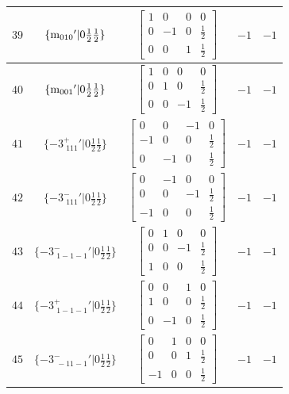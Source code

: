 \documentclass[fleqn,8pt]{jsarticle}
\begin{document}
\begin{longtable}{ccccc}
$ 39 $ & $ \{{\rm m}_{010}{}'|0 \frac{1}{2} \frac{1}{2}\} $ & $ \begin{bmatrix} 1 & 0 & 0 & 0 \\ 0 & -1 & 0 & \frac{1}{2} \\ 0 & 0 & 1 & \frac{1}{2} \end{bmatrix} $ & $ -1 $ & $ -1 $ \\ \hline
$ 40 $ & $ \{{\rm m}_{001}{}'|0 \frac{1}{2} \frac{1}{2}\} $ & $ \begin{bmatrix} 1 & 0 & 0 & 0 \\ 0 & 1 & 0 & \frac{1}{2} \\ 0 & 0 & -1 & \frac{1}{2} \end{bmatrix} $ & $ -1 $ & $ -1 $ \\ \hline
$ 41 $ & $ \{-3^{+}_{\,\,111}{}'|0 \frac{1}{2} \frac{1}{2}\} $ & $ \begin{bmatrix} 0 & 0 & -1 & 0 \\ -1 & 0 & 0 & \frac{1}{2} \\ 0 & -1 & 0 & \frac{1}{2} \end{bmatrix} $ & $ -1 $ & $ -1 $ \\ \hline
$ 42 $ & $ \{-3^{-}_{\,\,111}{}'|0 \frac{1}{2} \frac{1}{2}\} $ & $ \begin{bmatrix} 0 & -1 & 0 & 0 \\ 0 & 0 & -1 & \frac{1}{2} \\ -1 & 0 & 0 & \frac{1}{2} \end{bmatrix} $ & $ -1 $ & $ -1 $ \\ \hline
$ 43 $ & $ \{-3^{-}_{\,\,1-1-1}{}'|0 \frac{1}{2} \frac{1}{2}\} $ & $ \begin{bmatrix} 0 & 1 & 0 & 0 \\ 0 & 0 & -1 & \frac{1}{2} \\ 1 & 0 & 0 & \frac{1}{2} \end{bmatrix} $ & $ -1 $ & $ -1 $ \\ \hline
$ 44 $ & $ \{-3^{+}_{\,\,1-1-1}{}'|0 \frac{1}{2} \frac{1}{2}\} $ & $ \begin{bmatrix} 0 & 0 & 1 & 0 \\ 1 & 0 & 0 & \frac{1}{2} \\ 0 & -1 & 0 & \frac{1}{2} \end{bmatrix} $ & $ -1 $ & $ -1 $ \\ \hline
$ 45 $ & $ \{-3^{-}_{\,\,-11-1}{}'|0 \frac{1}{2} \frac{1}{2}\} $ & $ \begin{bmatrix} 0 & 1 & 0 & 0 \\ 0 & 0 & 1 & \frac{1}{2} \\ -1 & 0 & 0 & \frac{1}{2} \end{bmatrix} $ & $ -1 $ & $ -1 $ \\ \hline

\end{longtable}
\end{document}

